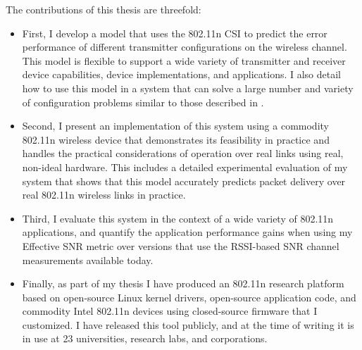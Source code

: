 The contributions of this thesis are threefold:
\begin{itemize}
\item First, I develop a model that uses the 802.11n CSI to predict the error performance of different transmitter configurations on the wireless channel. This model is flexible to support a wide variety of transmitter and receiver device capabilities, device implementations, and applications. I also detail how to use this model in a system that can solve a large number and variety of configuration problems similar to those described in .
\item Second, I present an implementation of this system using a commodity 802.11n wireless device that demonstrates its feasibility in practice and handles the practical considerations of operation over real links using real, non-ideal hardware. This includes a detailed experimental evaluation of my system that shows that this model accurately predicts packet delivery over real 802.11n wireless links in practice.
\item Third, I evaluate this system in the context of a wide variety of 802.11n applications, and quantify the application performance gains when using my Effective SNR metric over versions that use the RSSI-based SNR channel measurements available today.
\item Finally, as part of my thesis I have produced an 802.11n research platform based on open-source Linux kernel drivers, open-source application code, and commodity Intel 802.11n devices using closed-source firmware that I customized.
I have released this tool publicly, and at the time of writing it is in use at 23 universities, research labs, and corporations.
\end{itemize}


